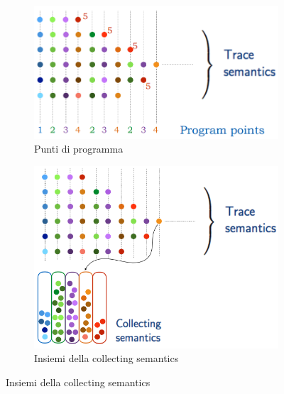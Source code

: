 \documentclass[a4paper,oneside,titlepage]{book}
\begin{document}
\begin{figure}[htp]
	\begin{subfigure}{0.49\textwidth}
	    \centering
		\includegraphics[width=\textwidth, height=\textheight, keepaspectratio]{cs1.png}
		\caption{Punti di programma}
	\end{subfigure}
	\hfill
	\begin{subfigure}{0.49\textwidth}
	    \centering
		\includegraphics[width=\textwidth, height=\textheight, keepaspectratio]{cs2.png} 
		\caption{Insiemi della collecting semantics}
	\end{subfigure}
\end{figure}
\end{document}
